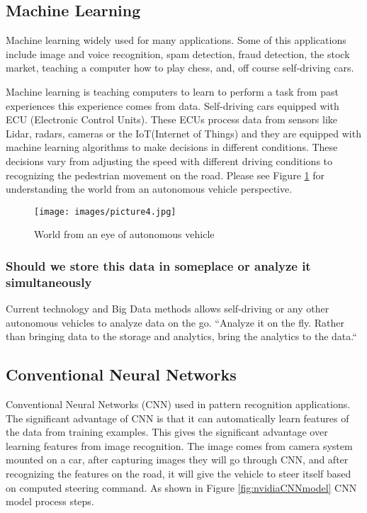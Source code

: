 \documentclass[sigconf]{acmart}
\begin{document}
\subsection{Machine Learning}

Machine learning widely used for many applications. Some of this applications include image and voice recognition, spam detection, fraud detection, the stock market, teaching a computer how to play chess, and, off course self-driving cars. 
\par Machine learning is teaching computers to learn to perform a task from past experiences this experience comes from data. Self-driving cars equipped with ECU (Electronic Control Units). These ECUs process data from sensors like Lidar, radars, cameras or the IoT(Internet of Things) and they are equipped with machine learning algorithms to make decisions in different conditions\cite{www-kdnuggets}. These decisions vary from adjusting the speed with different driving conditions to recognizing the pedestrian movement on the road. Please see Figure \ref{fig:Lidar} for understanding the world from an autonomous vehicle perspective\cite{www-digits-hbs}. 

\begin{figure}[!ht]
  \centering
      \texttt{[image: images/picture4.jpg]}
  \caption{World from an eye of autonomous vehicle}\label{fig:Lidar}
\end{figure}

\subsubsection{Should we store this data in someplace or analyze it simultaneously}
Current technology and Big Data methods allows self-driving or any other autonomous vehicles to analyze data on the go\cite{www-sas}.
    ``Analyze it on the fly. Rather than bringing data to the storage and analytics, bring the analytics to the data\cite{www-sas}.``

\subsection{Conventional Neural Networks}

Conventional Neural Networks (CNN)\cite{nvidia} used in pattern recognition applications. The significant advantage of CNN is that it can automatically learn features of the data from training examples\cite{nvidia}. This gives the significant advantage over learning features from image recognition. The image comes from camera system mounted on a car, after capturing images they will go through CNN, and after recognizing the features on the road, it will give the vehicle to steer itself based on computed steering command\cite{nvidia}. As shown in Figure \ref{fig:nvidiaCNNmodel} CNN model process steps\cite{nvidia}. 
\end{document}
